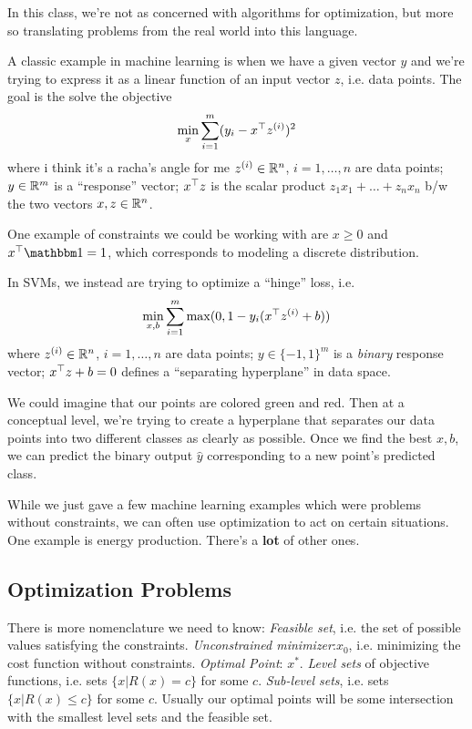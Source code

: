 \documentclass[11 pt]{scrartcl}
\begin{document}
In this class, we're not as concerned with algorithms for optimization, but more so translating problems from the real world into this language. 

\begin{example}
A classic example in machine learning is when we have a given vector $y$ and we're trying to express it as a linear function of an input vector $z$, i.e. data points. 
The goal is the solve the objective 
\[ \min_x \sum_{i=1}^m (y_i - x^\top z^{(i)})^2\] 
where i think it’s a racha’s angle for me
\itemnum
    \ii $z^{(i)}\in \mathbb R^n$, $i=1, \dots, n$ are data points; 
    \ii $y\in \mathbb R^m$ is a ``response'' vector; 
    \ii $x^\top z$ is the scalar product $z_1x_1+\dots + z_nx_n$ b/w the two vectors $x,z \in \mathbb R^n$. 
\itemend

One example of constraints we could be working with are $x\geq 0$ and $x^\T \one = 1$, which corresponds to modeling a discrete distribution.

\end{example}

\begin{example}
In SVMs, we instead are trying to optimize a ``hinge'' loss, i.e. 
\[ \min_{x,b} \sum_{i=1}^m \max(0, 1-y_i(x^\top z^{(i)} + b))\] 
where 
\itemnum
    \ii $z^{(i)}\in \mathbb R^n$, $i=1, \dots, n$ are data points; 
    \ii $y\in \{-1, 1\}^m$ is a \emph{binary} response vector; 
    \ii $x^\top z + b = 0$ defines a ``separating hyperplane'' in data space. 
\itemend

We could imagine that our points are colored green and red.
Then at a conceptual level, we're trying to create a hyperplane that separates our data points into two different classes as clearly as possible. 
Once we find the best $x,b$, we can predict the binary output $\hat{y}$ corresponding to a new point's predicted class.
\end{example}

While we just gave a few machine learning examples which were problems without constraints, we can often use optimization to act on certain situations. 
One example is energy production. 
There's a \textbf{lot} of other ones. 


\subsection{Optimization Problems}
There is more nomenclature we need to know: 
\itemnum
    \ii \emph{Feasible set}, i.e. the set of possible values satisfying the constraints. 
    \ii \emph{Unconstrained minimizer}:$x_0$, i.e. minimizing the cost function without constraints. 
    \ii \emph{Optimal Point}: $x^*$. 
    \ii \emph{Level sets} of objective functions, i.e. sets $\{x | R(x) = c\}$ for some $c$. 
    \ii \emph{Sub-level sets}, i.e. sets $\{ x | R(x) \leq c\}$ for some $c$. 
\itemend
Usually our optimal points will be some intersection with the smallest level sets and the feasible set. 
\end{document}

